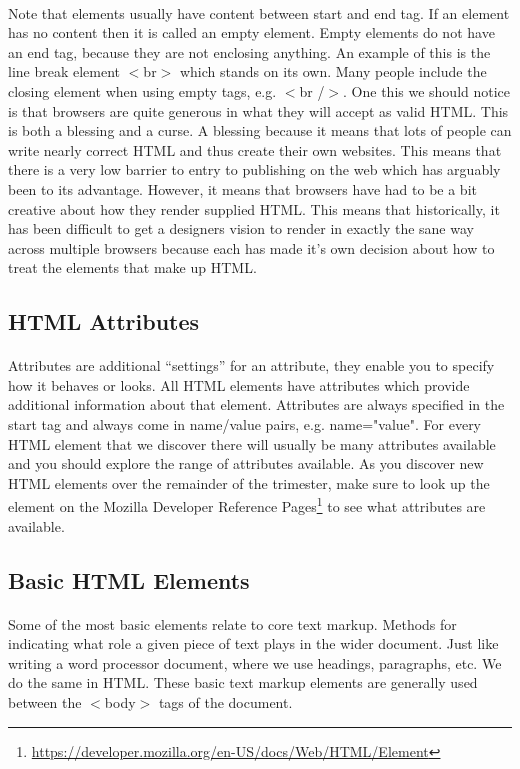 \documentclass[10pt, a4paper]{article}
\begin{document}
\paragraph{} Note that elements usually have content between start and end tag. If an element has no content then it is called an empty element. Empty elements do not have an end tag, because they are not enclosing anything. An example of this is the line break element $<$br$>$ which stands on its own. Many people include the closing element when using empty tags, e.g. $<$br /$>$. One this we should notice is that browsers are quite generous in what they will accept as valid HTML. This is both a blessing and a curse. A blessing because it means that lots of people can write nearly correct HTML and thus create their own websites. This means that there is a very low barrier to entry to publishing on the web which has arguably been to its advantage. However, it means that browsers have had to be a bit creative about how they render supplied HTML. This means that historically, it has been difficult to get a designers vision to render in exactly the sane way across multiple browsers because each has made it's own decision about how to treat the elements that make up HTML.


\subsection{HTML Attributes}
\paragraph{} Attributes are additional ``settings'' for an attribute, they enable you to specify how it behaves or looks. All HTML elements have attributes which provide additional information about that element. Attributes are always specified in the start tag and always come in name/value pairs, e.g. name="value". For every HTML element that we discover there will usually be many attributes available and you should explore the range of attributes available. As you discover new HTML elements over the remainder of the trimester, make sure to look up the element on the Mozilla Developer Reference Pages\footnote{\url{https://developer.mozilla.org/en-US/docs/Web/HTML/Element}} to see what attributes are available.

\subsection{Basic HTML Elements}
\paragraph{} Some of the most basic elements relate to core text markup. Methods for indicating what role a given piece of text plays in the wider document. Just like writing a word processor document, where we use headings, paragraphs, etc. We do the same in HTML. These basic text markup elements are generally used between the $<$body$>$ tags of the document.
\end{document}
